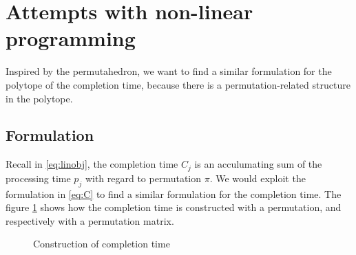 \documentclass[12pt,letterpaper]{article}
\begin{document}
\section{Attempts with non-linear programming}
Inspired by the permutahedron, we want to find a similar formulation for the polytope of the completion time,
because there is a permutation-related structure in the polytope. 

\subsection{Formulation}
Recall in \ref{eq:linobj}, the completion time $C_j$ is 
an acculumating sum of the processing time $p_j$ with regard to 
permutation $\pi$. We would exploit the formulation in \ref{eq:C} 
to find a similar formulation for the completion time. The figure \ref{fig:completion}
shows how the completion time is constructed with a permutation, and respectively with a permutation matrix.
\begin{figure}[h!]
    \centering
    \caption{Construction of completion time}
    \label{fig:completion}
\end{figure}
\end{document}
